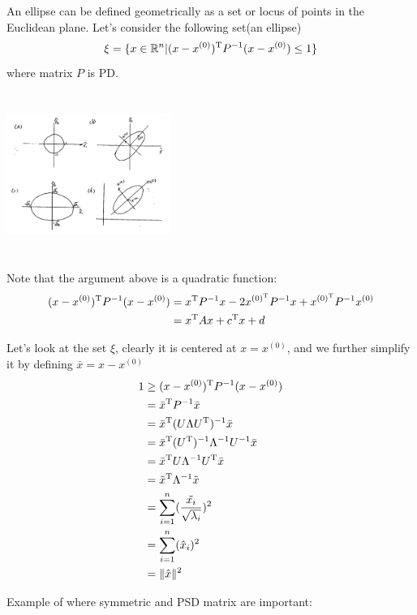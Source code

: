 An ellipse can be defined geometrically as a set or locus of points in the Euclidean plane. Let's consider the following set(an ellipse)
$$
\xi = \{x\in \mathbb{R}^n \vert (x - x^{(0)})^{{\rm T}} P^{-1}(x - x^{(0)}) \leq 1 \}
$$
where matrix $P$ is PD.

\begin{marginfigure}
	\centering
	\includegraphics[width=2.1in,height=2.1in]{figures/ch03/figure2.jpg}
\end{marginfigure}

Note that the argument above is a quadratic function:
\begin{align*}
(x - x^{(0)})^{{\rm T}}P^{-1}(x - x^{(0)}) &= x^{{\rm T}}P^{-1}x - 2x^{(0)^{{\rm T}}}P^{-1}x + x^{(0)^{{\rm T}}}P^{-1}x^{(0)}\\
&= x^{{\rm T}}Ax + c^{{\rm T}}x + d
\end{align*}

Let's look at the set $\xi$, clearly it is centered at $x = x^{(0)}$, and we further simplify it by defining $\bar{x}=x-x^{(0)}$
\begin{align*}
1 &\geq (x - x^{(0)})^{{\rm T}}P^{-1}(x - x^{(0)})\\
&= \bar{x}^{{\rm T}}P^{-1}\bar{x}\\
&= \bar{x}^{{\rm T}}(U\Lambda U^{{\rm T}})^{-1}\bar{x}\\
&= \bar{x}^{{\rm T}}(U^{{\rm T}})^{-1}\Lambda^{-1}U^{-1}\bar{x}\\
&= \bar{x}^{{\rm T}}U\Lambda^{-1}U^{{\rm T}}\bar{x}\\
&= \tilde{x}^{{\rm T}}\Lambda^{-1}\tilde{x}\\
&= \sum^n_{i=1}(\frac{\tilde{x_i}}{\sqrt{\lambda_i}})^2\\
&= \sum^n_{i=1}(\hat{x}_i)^2\\
&= \Vert \hat{x}\Vert^2
\end{align*}



\vspace{0.3cm}
Example of where symmetric and PSD matrix are important:

